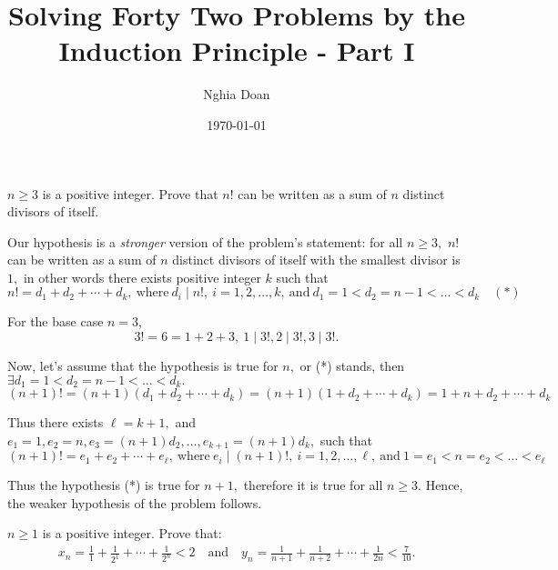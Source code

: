 \documentclass{article}
\title{Solving Forty Two Problems by the Induction Principle - Part I}
\author{Nghia Doan}
\date{\today}
\begin{document}
\maketitle

\begin{problem}
    $n \ge 3$ is a positive integer. Prove that $n!$ can be written as a sum of $n$ distinct divisors of itself.
\end{problem}

\begin{soln}
    Our hypothesis is a \textit{stronger} version of the problem's statement:
    for all $n \ge 3,$ $n!$ can be written as a sum of $n$ distinct divisors of itself with the smallest divisor is $1,$
    in other words there exists positive integer $k$ such that
    \[
        n! = d_1 + d_2 + \cdots + d_k,\ \text{where}\ d_i \mid n!,\ i=1,2,\ldots,k,\ \text{and}\ d_1 = 1 < d_2 = n-1 < \ldots < d_k \quad (*)
    \]

    For the base case $n=3,$ 
    \[
        3! = 6 = 1 + 2 + 3,\ 1 \mid 3!, 2 \mid 3!, 3 \mid 3!.
    \]
    
    Now, let's assume that the hypothesis is true for $n,$ or (*) stands, then $\exists d_1 = 1 < d_2 = n-1 < \ldots < d_k.$
    \[
        (n+1)! =  (n+1)(d_1 + d_2 + \cdots + d_k) = (n+1)(1 + d_2 + \cdots + d_k) 
        = 1 + n + d_2 + \cdots + d_k
    \]

    Thus there exists $\ell = k+1,$ and $e_1 = 1, e_2 = n, e_3 = (n+1)d_2, \ldots, e_{k+1} = (n+1)d_k,$ such that
    \[
        (n+1)! = e_1 + e_2 + \cdots + e_{\ell},\ \text{where}\ e_i \mid (n+1)!,\ i=1,2,\ldots,\ell,\ \text{and}\ 1 = e_1 < n = e_2 < \ldots < e_{\ell}
    \]

    Thus the hypothesis (*) is true for $n+1,$ therefore it is true for all $n \ge 3.$
    Hence, the weaker hypothesis of the problem follows.
\end{soln}

\begin{problem}
    $n \ge 1$ is a positive integer. Prove that:
    \[
        \begin{aligned}
            x_n = \frac{1}{1} + \frac{1}{2^1} + \cdots + \frac{1}{2^n} < 2 \quad \text{and} \quad
            y_n = \frac{1}{n+1} + \frac{1}{n+2} + \cdots + \frac{1}{2n} < \frac{7}{10}.
        \end{aligned}
    \]
\end{problem}
\end{document}
